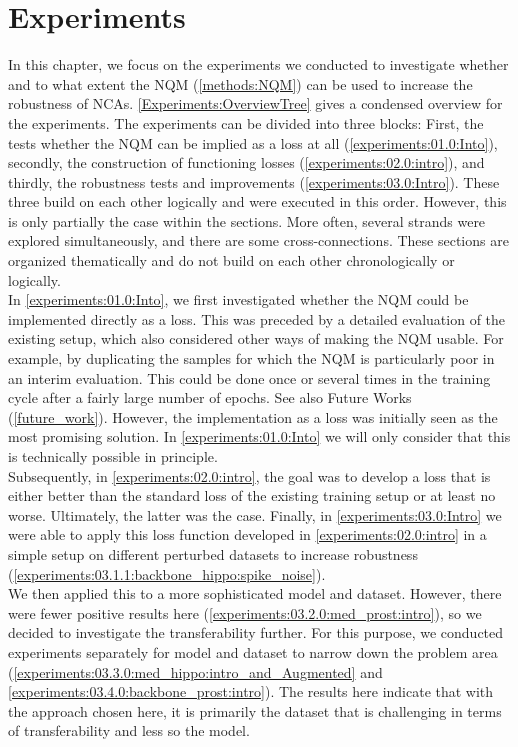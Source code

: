 \chapter{Experiments}
\label{experiments:intro}

In this chapter, we focus on the experiments we conducted to investigate whether and to what extent the NQM (\autoref{methods:NQM}) can be used to increase the robustness of NCAs. \autoref{Experiments:OverviewTree} gives a condensed overview for the experiments. The experiments can be divided into three blocks: First, the tests whether the NQM can be implied as a loss at all (\autoref{experiments:01.0:Into}), secondly, the construction of functioning losses (\autoref{experiments:02.0:intro}), and thirdly, the robustness tests and improvements (\autoref{experiments:03.0:Intro}). These three build on each other logically and were executed in this order. However, this is only partially the case within the sections. More often, several strands were explored simultaneously, and there are some cross-connections. These sections are organized thematically and do not build on each other chronologically or logically.\\
In \autoref{experiments:01.0:Into}, we first investigated whether the NQM could be implemented directly as a loss. This was preceded by a detailed evaluation of the existing setup, which also considered other ways of making the NQM usable. For example, by duplicating the samples for which the NQM is particularly poor in an interim evaluation. This could be done once or several times in the training cycle after a fairly large number of epochs. See also Future Works (\autoref{future_work}). However, the implementation as a loss was initially seen as the most promising solution. In \autoref{experiments:01.0:Into} we will only consider that this is technically possible in principle.\\
Subsequently, in \autoref{experiments:02.0:intro}, the goal was to develop a loss that is either better than the standard loss of the existing training setup or at least no worse. Ultimately, the latter was the case.
Finally, in \autoref{experiments:03.0:Intro} we were able to apply this loss function developed in \autoref{experiments:02.0:intro} in a simple setup on different perturbed datasets to increase robustness (\autoref{experiments:03.1.1:backbone_hippo:spike_noise}).\\
We then applied this to a more sophisticated model and dataset. However, there were fewer positive results here (\autoref{experiments:03.2.0:med_prost:intro}), so we decided to investigate the transferability further. For this purpose, we conducted experiments separately for model and dataset to narrow down the problem area (\autoref{experiments:03.3.0:med_hippo:intro_and_Augmented} and \autoref{experiments:03.4.0:backbone_prost:intro}). The results here indicate that with the approach chosen here, it is primarily the dataset that is challenging in terms of transferability and less so the model.
